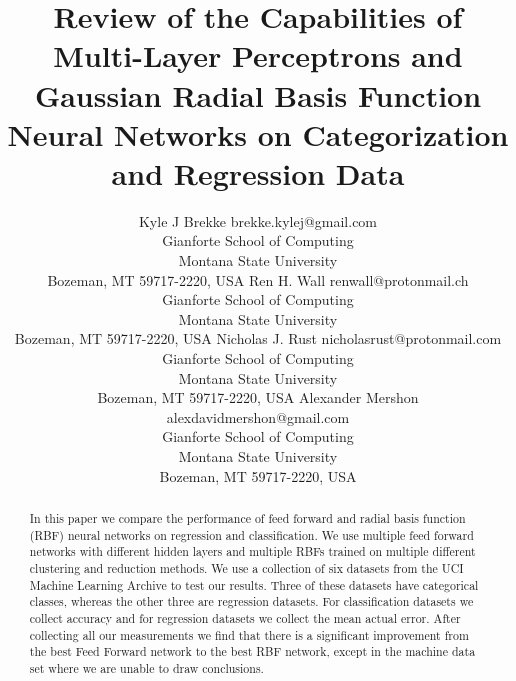 \documentclass[twoside,11pt]{article}
\begin{document}
	
	\title{Review of the Capabilities of Multi-Layer Perceptrons and Gaussian Radial Basis Function Neural Networks on Categorization and Regression Data}
	
	\author{\name Kyle J Brekke \email brekke.kylej@gmail.com \\
		\addr Gianforte School of Computing\\
		Montana State University\\
		Bozeman, MT 59717-2220, USA
		\AND
		\name Ren H. Wall \email renwall@protonmail.ch \\
		\addr Gianforte School of Computing\\
		Montana State University\\
		Bozeman, MT 59717-2220, USA
		\AND
		\name Nicholas J. Rust \email  nicholasrust@protonmail.com \\
		\addr Gianforte School of Computing\\
		Montana State University\\
		Bozeman, MT 59717-2220, USA
		\AND
		\name Alexander Mershon \email alexdavidmershon@gmail.com \\
		\addr Gianforte School of Computing\\
		Montana State University\\
		Bozeman, MT 59717-2220, USA}
	
	
	\maketitle
	
	\begin{abstract}
		In this paper we compare the performance of feed forward and radial basis function (RBF) neural networks on regression and classification. We use multiple feed forward networks with different hidden layers and multiple RBFs trained on multiple different clustering and reduction methods.
		We use a collection of six datasets from the UCI Machine Learning Archive to test our results.
		Three of these datasets have categorical classes, whereas the other three are regression datasets. For classification datasets we collect accuracy and for regression datasets we collect the mean actual error. After collecting all our measurements we find that there is a significant improvement from the best Feed Forward network to the best RBF network, except in the machine data set where we are unable to draw conclusions. 
	\end{abstract}
	
\end{document}
